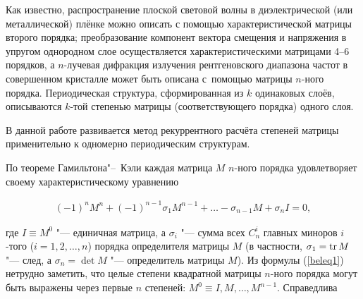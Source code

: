 Как известно, распространение плоской световой волны в  диэлектрической (или металлической) плёнке можно описать с помощью характеристической матрицы  второго порядка; преобразование компонент вектора смещения и напряжения в упругом однородном слое осуществляется  характеристическими  матрицами  4--6 порядков, а  $n$-лучевая дифракция излучения рентгеновского диапазона частот в совершенном кристалле может быть описана с~помощью матрицы $n$-ного порядка.  Периодическая  структура, сформированная из $k$ одинаковых слоёв, описываются $k$-той степенью матрицы (соответствующего порядка) одного слоя. 



 В данной работе развивается метод рекуррентного расчёта степеней матрицы применительно к одномерно периодическим структурам.



\pagebreak



 По теореме Гамильтона"--~Кэли каждая матрица $M$ $n$-ного порядка удовлетворяет своему характеристическому уравнению

\begin{eqnarray}

\label{beleq1}	(-1)^nM^n+(-1)^{n-1}\sigma_1M^{n-1}+ \dots -\sigma_{n-1}M+\sigma_nI=0,

\end{eqnarray}

где $I\equiv M^0$ "--- единичная матрица, а $\sigma_i$ "--- сумма всех $C^i_n$ главных миноров $i$-того ($i=1, 2,  \dots , n$) порядка определителя матрицы $M$ (в частности, $\sigma_1={\rm tr}\,M$ "--- след, а $\sigma_n=\det M$ "--- определитель матрицы $M$). Из формулы (\ref{beleq1}) нетрудно заметить, что целые степени квадратной матрицы   $n$-ного порядка  могут быть выражены через первые $n$ степеней: $M^0\equiv I,M, \dots ,M^{n-1}$. Справедлива 



\smallskip

